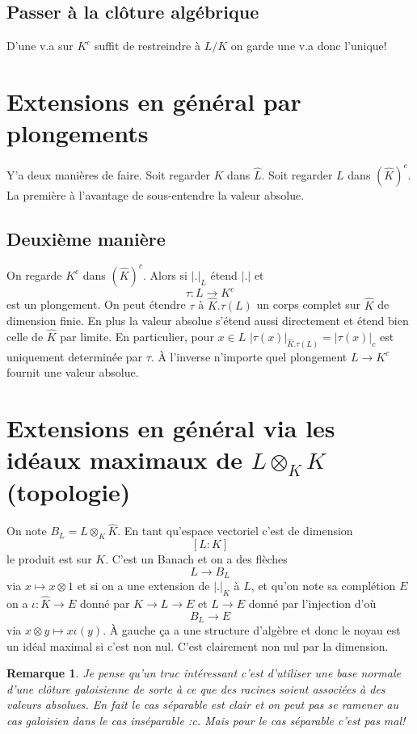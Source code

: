 \documentclass[a4paper,12pt]{book}
\theoremstyle{plain}
\newtheorem{rem}{Remarque}
\theoremstyle{definition}
\theoremstyle{remark}
\begin{document}
\subsection{Passer à la clôture algébrique}
D'une v.a sur $K^c$ suffit de restreindre à $L/K$
on garde une v.a donc l'unique!

\section{Extensions en général par plongements}

Y'a deux manières de faire. Soit regarder
$K$ dans $\hat L$. Soit regarder $L$ dans
$(\hat K)^c$. La première à l'avantage de 
sous-entendre la valeur absolue.
\subsection{Deuxième manière}
On regarde $K^c$ dans $(\hat K)^c$.
Alors si $|.|_L$ étend $|.|$ et
\[\tau \colon L\to K^c\] est un plongement.
On peut étendre $\tau$ à $\hat K.\tau(L)$ un
corps complet sur $\hat K$ de dimension finie.
En plus la valeur absolue s'étend aussi 
directement et étend bien celle de $\hat K$
par limite. En particulier, pour $x\in L$
$|\tau(x)|_{\hat K.\tau(L)}=|\tau(x)|_c$ est
uniquement determinée par $\tau$. À l'inverse
n'importe quel plongement $L\to K^c$ fournit
une valeur absolue.

\section{Extensions en général via les idéaux
maximaux de $L\otimes_K\hat K$ (topologie)}
On note $B_L=L\otimes_K \hat K$. En tant qu'espace
vectoriel c'est de dimension 
\[[L:K]\]
le produit est sur $K$. C'est un Banach et on a 
des flèches
\[L\to B_L\]
via $x\mapsto x\otimes 1$ et si on a une extension de $|.|_K$ à
$L$, et qu'on note sa complétion $E$ on a
$\iota \colon\hat K\to E$ donné par $K\to L\to E$ et
$L\to E$ donné par l'injection d'où 
\[B_L\to E\]
via $x\otimes y\mapsto x\iota(y)$. À gauche ça a une structure
d'algèbre et donc le noyau est un idéal maximal si c'est
non nul. C'est clairement non nul par la dimension.

\begin{rem}
    Je pense qu'un truc intéressant c'est d'utiliser une base
    normale d'une clôture galoisienne de sorte à ce que des racines
    soient associées à des valeurs absolues. En fait le cas 
    séparable est clair et on peut pas se ramener au cas galoisien
    dans le cas inséparable :c. Mais pour
     le cas séparable c'est pas
    mal!
\end{rem}
\end{document}
